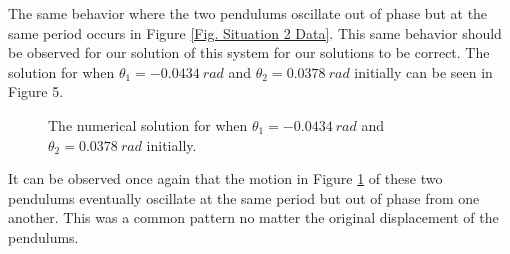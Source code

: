 \documentclass[twocolumn]{article}
\begin{document}
\par \noindent
The same behavior where the two pendulums oscillate out of phase but at the same period occurs in Figure \ref{Fig. Situation 2 Data}. This same behavior should be observed for our solution of this system for our solutions to be correct. The solution for when $\theta_1=-0.0434 \ rad$ and $\theta_2=0.0378 \ rad$ initially can be seen in Figure 5.
\newpage
\begin{figure}[h]
    \centering
    \caption{\small{The numerical solution for when $\theta_1=-0.0434 \ rad$ and $\theta_2=0.0378 \ rad$ initially.}}
    \label{Fig. Situation 2 Solution}
\end{figure}
\par \noindent
It can be observed once again that the motion in Figure \ref{Fig. Situation 2 Solution} of these two pendulums eventually oscillate at the same period but out of phase from one another. This was a common pattern no matter the original displacement of the pendulums.
\end{document}
